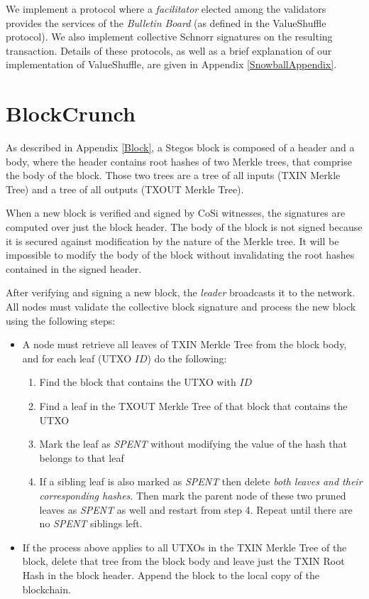 \documentclass[a4paper, 10pt, conference]{ieeeconf}
\begin{document}
We implement a protocol where a \textit{facilitator} elected among the validators provides the services of the \textit{Bulletin Board} (as defined in the ValueShuffle protocol). We also implement collective Schnorr signatures\cite{c22} on the resulting transaction. Details of these protocols, as well as a brief explanation of our implementation of ValueShuffle, are given in Appendix \ref{SnowballAppendix}.

\section{BlockCrunch}\label{Pruning}

As described in Appendix \ref{Block}, a Stegos block is composed of a header and a body, where the header contains root hashes of two Merkle trees, that comprise the body of the block. Those two trees are a tree of all inputs (TXIN Merkle Tree) and a tree of all outputs (TXOUT Merkle Tree). 

When a new block is verified and signed by CoSi witnesses, the signatures are computed over just the block header. The body of the block is not signed because it is secured against modification by the nature of the Merkle tree. It will be impossible to modify the body of the block without invalidating the root hashes contained in the signed header.

After verifying and signing a new block, the \textit{leader} broadcasts it to the network. All nodes must validate the collective block signature and process the new block using the following steps:

\begin{itemize}
	\item {A node must retrieve all leaves of TXIN Merkle Tree from the block body, and for each leaf (UTXO $ID$) do the following:
	\begin{enumerate}
		\item {Find the block that contains the UTXO with $ID$}
		   \item {Find a leaf in the TXOUT Merkle Tree of that block that contains the UTXO}
		\item {Mark the leaf as \textit{SPENT} without modifying the value of the hash that belongs to that leaf}
		\item {If a sibling leaf is also marked as \textit{SPENT} then delete \textit{both leaves and their corresponding hashes}. Then mark the parent node of these two pruned leaves as \textit{SPENT} as well and restart from step 4. Repeat until there are no \textit{SPENT} siblings left.}
	\end{enumerate}} 
	\item {If the process above applies to all UTXOs in the TXIN Merkle Tree of the block, delete that tree from the block body and leave just the TXIN Root Hash in the block header. Append the block to the local copy of the blockchain.}
\end{itemize}
\end{document}
